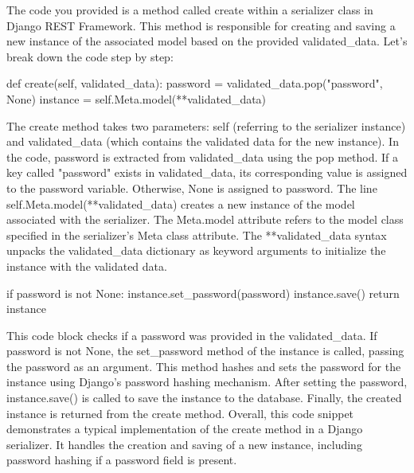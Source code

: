 
The code you provided is a method called create within a serializer
 class in Django REST Framework. This method is responsible for 
 creating and saving a new instance of the associated model based 
 on the provided validated_data. Let's break down the code step by step:


 def create(self, validated_data):
    password = validated_data.pop("password", None)
    instance = self.Meta.model(**validated_data)


The create method takes two parameters: self (referring to the serializer instance)
and validated_data (which contains the validated data for the new instance).
In the code, password is extracted from validated_data using the pop method.
If a key called "password" exists in validated_data, its corresponding value
 is assigned to the password variable. Otherwise, None is assigned to password.
The line self.Meta.model(**validated_data) creates a new instance of the model 
associated with the serializer. The Meta.model attribute refers to the model
 class specified in the serializer's Meta class attribute. The **validated_data 
 syntax unpacks the validated_data dictionary as keyword arguments to initialize 
 the instance with the validated data.


if password is not None:
    instance.set_password(password)
instance.save()
return instance

This code block checks if a password was provided in the validated_data. 
If password is not None, the set_password method of the instance is called,
passing the password as an argument. This method hashes and sets the password
for the instance using Django's password hashing mechanism.
After setting the password, instance.save() is called to save the instance to the database.
Finally, the created instance is returned from the create method.
Overall, this code snippet demonstrates a typical implementation of
the create method in a Django serializer. It handles the creation and saving
of a new instance, including password hashing if a password field is present.




